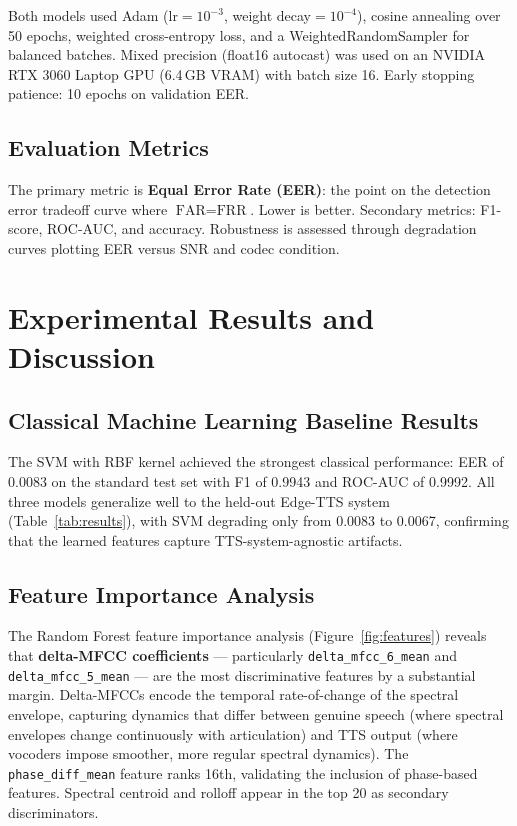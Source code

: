 \documentclass[12pt, a4paper, oneside]{report}
\begin{document}
Both models used Adam (lr$=10^{-3}$, weight decay$=10^{-4}$), cosine annealing over 50 epochs, weighted cross-entropy loss, and a WeightedRandomSampler for balanced batches. Mixed precision (float16 autocast) was used on an NVIDIA RTX 3060 Laptop GPU (6.4\,GB VRAM) with batch size 16. Early stopping patience: 10 epochs on validation EER.

\section{Evaluation Metrics}

The primary metric is \textbf{Equal Error Rate (EER)}: the point on the detection error tradeoff curve where $\text{FAR} = \text{FRR}$. Lower is better. Secondary metrics: F1-score, ROC-AUC, and accuracy. Robustness is assessed through degradation curves plotting EER versus SNR and codec condition.

\chapter{Experimental Results and Discussion}
\label{ch:results}

\section{Classical Machine Learning Baseline Results}

The SVM with RBF kernel achieved the strongest classical performance: EER of 0.0083 on the standard test set with F1 of 0.9943 and ROC-AUC of 0.9992. All three models generalize well to the held-out Edge-TTS system (Table~\ref{tab:results}), with SVM degrading only from 0.0083 to 0.0067, confirming that the learned features capture TTS-system-agnostic artifacts.

\section{Feature Importance Analysis}

The Random Forest feature importance analysis (Figure~\ref{fig:features}) reveals that \textbf{delta-MFCC coefficients} --- particularly \texttt{delta\_mfcc\_6\_mean} and \texttt{delta\_mfcc\_5\_mean} --- are the most discriminative features by a substantial margin. Delta-MFCCs encode the temporal rate-of-change of the spectral envelope, capturing dynamics that differ between genuine speech (where spectral envelopes change continuously with articulation) and TTS output (where vocoders impose smoother, more regular spectral dynamics). The \texttt{phase\_diff\_mean} feature ranks 16th, validating the inclusion of phase-based features. Spectral centroid and rolloff appear in the top 20 as secondary discriminators.
\end{document}
